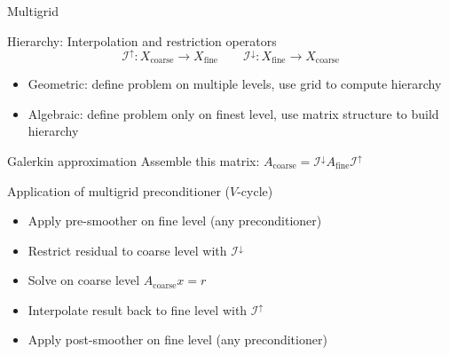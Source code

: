 \begin{frame}[shrink=5]{Multigrid}
  \begin{block}{Hierarchy: Interpolation and restriction operators}
    \begin{equation*}
    \mathcal{I}^\uparrow : X_{\text{coarse}} \to X_{\text{fine}} \qquad
    \mathcal{I}^\downarrow :  X_{\text{fine}} \to X_{\text{coarse}}
  \end{equation*}
  \end{block}
  \begin{itemize}
  \item Geometric: define problem on multiple levels, use grid to compute hierarchy
  \item Algebraic: define problem only on finest level, use matrix structure to build hierarchy
  \end{itemize}
  
  \begin{block}{Galerkin approximation}
    Assemble this matrix: $A_{\text{coarse}} = \mathcal{I}^\downarrow A_{\text{fine}} \mathcal{I}^\uparrow$
  \end{block}
  
  \begin{block}{Application of multigrid preconditioner ($V$-cycle)}
    \begin{itemize}
    \item Apply pre-smoother on fine level (any preconditioner)
    \item Restrict residual to coarse level with $\mathcal{I}^\downarrow$
    \item Solve on coarse level $A_{\text{coarse}} x = r$
    \item Interpolate result back to fine level with $\mathcal{I}^\uparrow$
    \item Apply post-smoother on fine level (any preconditioner)
    \end{itemize}
  \end{block}
\end{frame}


